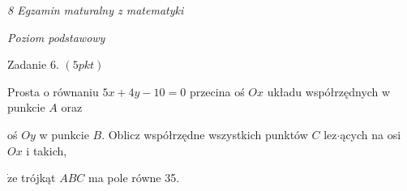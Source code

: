 \documentclass[a4paper,12pt]{article}
\begin{document}
{\it 8 Egzamin maturalny z matematyki}

{\it Poziom podstawowy}

Zadanie 6. $(5pkt)$

Prosta o równaniu $5x+4y-10=0$ przecina oś $Ox$ układu współrzędnych w punkcie $A$ oraz

oś $Oy$ w punkcie $B$. Oblicz współrzędne wszystkich punktów $C$ lez$\cdot$ących na osi $Ox$ i takich,

$\dot{\mathrm{z}}\mathrm{e}$ trójkąt $ABC$ ma pole równe 35.
\end{document}
